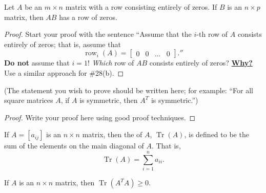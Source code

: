 \documentclass{amsart}
\DeclareMathOperator{\Row}{row}
\DeclareMathOperator{\trace}{Tr}
\begin{document}
\begin{prop*}[\S1.3, \#28a] 
Let $A$ be an $m \times n$ matrix with a row consisting entirely of zeros. If $B$ is an $n \times p$ matrix, then $AB$ has a row of zeros.
\end{prop*}

\begin{proof}
	Start your proof with the sentence ``Assume that the $i$-th row of $A$ consists entirely of zeros; that is, assume that 
	\[
		\Row_i(A) = \begin{bmatrix} 0 & 0 & \dots & 0\end{bmatrix}.'' 
	\]
	{\bf Do not} assume that $i=1$! {\it Which} row of $AB$ consists entirely of zeros?  {\bf \underline{Why?}}  Use a similar approach for \#28(b). 
\end{proof}






\begin{prop*}[\S1.3, \#28b] 
(The statement you wish to prove should be written here; for example: ``For all square matrices $A$, if $A$ is symmetric, then $A^T$ is symmetric.'')
\end{prop*}

\begin{proof}
	Write your proof here using good proof techniques. 
\end{proof}





\begin{defn*}
If $A = [a_{ij}]$ is an $n \times n$ matrix, then the  of $A$, $\trace(A)$, is defined to be the sum of the elements on the main diagonal of $A$.  That is, 
\[
\trace(A) = \sum_{i = 1}^n a_{ii}.
\]
\end{defn*}



\begin{prop*} 
If $A$ is an $n \times n$ matrix, then $\trace(A^{T} A) \geq 0$.
\end{prop*}

\end{document}
